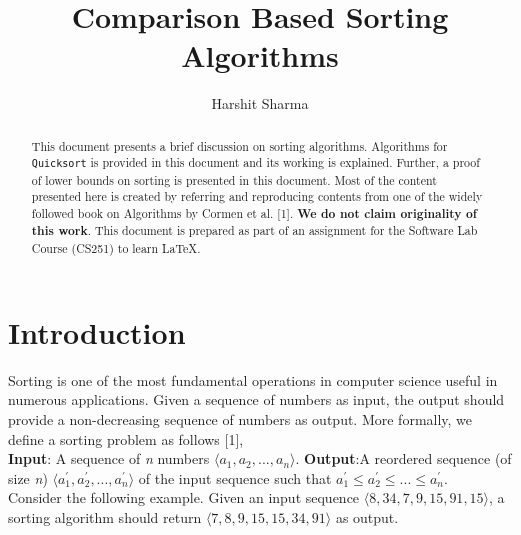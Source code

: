 \documentclass[a4paper, 10pt,twocolumn]{article}
\title{Comparison Based Sorting Algorithms}
\author{Harshit Sharma}
\date{}
\begin{document}
\maketitle
\begin{abstract}
This document presents a brief discussion on sorting algorithms. Algorithms for \texttt{Quicksort} is provided in this document and its working is explained. Further, a proof of lower bounds on sorting is presented in this document. Most of the content presented here is created by referring and reproducing contents from one of the widely followed book on Algorithms by Cormen et al. [1]. \textbf{We do not claim originality of this work}. This document is prepared as part of an assignment for the Software Lab Course (CS251) to learn \LaTeX.
\noindent{}

\end{abstract}    
\section{Introduction}
Sorting is one of the most fundamental operations in computer science useful in numerous applications. Given a sequence of numbers as input, the output should provide a non-decreasing sequence of numbers as output. More formally, we define a sorting problem as follows [1],\\
\textbf{Input}: A sequence of \textit{n} numbers $\langle a_{1},a_{2},...,a_{n} \rangle$.
\textbf{Output}:A  reordered sequence (of  size  \textit{n}) $\langle a^{'}_{1},a^{'}_{2},...,a^{'}_{n} \rangle$ of the input sequence such that $a^{'}_{1} \leq a^{'}_{2} \leq ... \leq a^{'}_{n}$.\\
Consider the following example. Given an input sequence $\langle8, 34, 7, 9, 15, 91, 15\rangle$, a sorting algorithm should return $\langle7, 8, 9, 15, 15, 34, 91\rangle$ as output.
\end{document}
